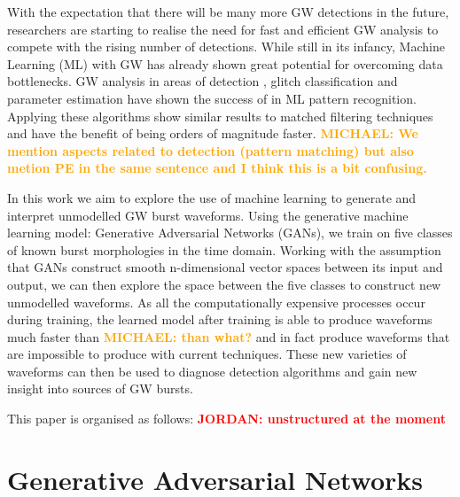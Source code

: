 \documentclass[12pt]{iopart}
\newcommand{\jordan}[1]{\textbf{\textcolor{red}{JORDAN: #1}}}
\newcommand{\michael}[1]{\textbf{\textcolor{orange}{MICHAEL: #1}}}
\begin{document}
With the expectation that there will be many more \ac{GW} detections in the future, researchers are starting to realise the need for fast and efficient \ac{GW} analysis to compete with the rising number of detections. While still in its infancy, Machine Learning (ML) with GW has already shown great potential for overcoming data bottlenecks. \ac{GW} analysis in areas of detection \cite{Gabbard2017,Gebhard_2019,Krastev_2020}, glitch classification \cite{Bahaadini, George_2018,Razzano_2018} and
parameter estimation \cite{gabbard2019bayesian,shen2019deterministic,green2020gravitationalwave} have shown the success of in ML pattern recognition. Applying these algorithms show similar results to matched filtering techniques and have the benefit of being orders of magnitude faster. \michael{We mention aspects related to detection (pattern matching) but also metion PE in the same sentence and I think this is a bit confusing.}

%

In this work we aim to explore the use of machine learning to generate and interpret
unmodelled \ac{GW} burst waveforms. Using the generative machine learning model: Generative Adversarial Networks (GANs), we train on five classes of known burst morphologies in the time domain. Working with the assumption that GANs construct smooth n-dimensional vector spaces between its input and output, we can then explore the space between the five classes to construct new unmodelled waveforms. As all the computationally expensive processes occur during training, the learned model after
training is able to produce waveforms much faster than \michael{than what?} and in fact produce waveforms that are impossible to produce with current techniques. These new varieties of waveforms can then be used to diagnose detection algorithms and gain new insight into sources of \ac{GW} bursts. 
%

This paper is organised as follows: \jordan{unstructured at the moment}


\section{Generative Adversarial Networks}

\end{document}

